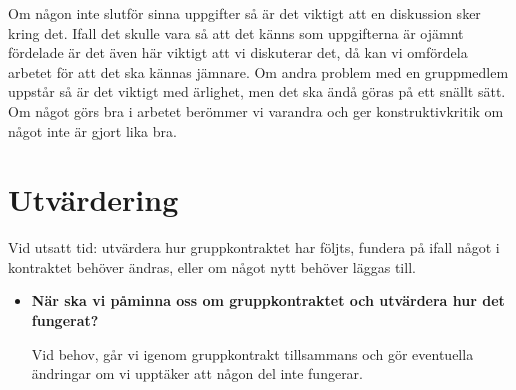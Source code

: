 \documentclass{TDP005mall}
\begin{document}
Om någon inte slutför sinna uppgifter så är det viktigt att en diskussion sker kring det. Ifall det skulle vara så att det känns som uppgifterna är ojämnt fördelade är det även här viktigt att vi diskuterar det, då kan vi omfördela arbetet för att det ska kännas jämnare. Om andra problem med en gruppmedlem uppstår så är det viktigt med ärlighet, men det ska ändå göras på ett snällt sätt. Om något görs bra i arbetet berömmer vi varandra och ger konstruktivkritik om något inte är gjort lika bra.

\section{Utvärdering}

Vid utsatt tid: utvärdera hur gruppkontraktet har följts, fundera på ifall något i kontraktet behöver ändras, eller om något nytt behöver läggas till.

\begin{itemize}
\item \textbf{När ska vi påminna oss om gruppkontraktet och utvärdera hur det fungerat?}

  Vid behov, går vi igenom gruppkontrakt tillsammans och gör eventuella ändringar om vi upptäker att någon del inte fungerar.

\end{itemize}
\end{document}
